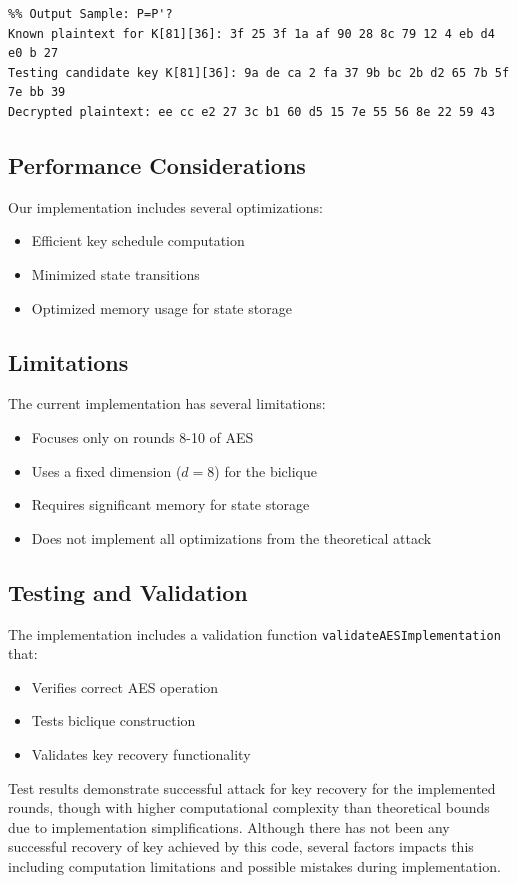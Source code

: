 \documentclass{report}
\begin{document}
\begin{verbatim}
%% Output Sample: P=P'?
Known plaintext for K[81][36]: 3f 25 3f 1a af 90 28 8c 79 12 4 eb d4 e0 b 27 
Testing candidate key K[81][36]: 9a de ca 2 fa 37 9b bc 2b d2 65 7b 5f 7e bb 39 
Decrypted plaintext: ee cc e2 27 3c b1 60 d5 15 7e 55 56 8e 22 59 43
\end{verbatim}

\subsection{Performance Considerations}
Our implementation includes several optimizations:
\begin{itemize}
    \item Efficient key schedule computation
    \item Minimized state transitions
    \item Optimized memory usage for state storage
\end{itemize}

\subsection{Limitations}
The current implementation has several limitations:
\begin{itemize}
    \item Focuses only on rounds 8-10 of AES
    \item Uses a fixed dimension ($d = 8$) for the biclique
    \item Requires significant memory for state storage
    \item Does not implement all optimizations from the theoretical attack
\end{itemize}

\subsection{Testing and Validation}
The implementation includes a validation function \texttt{validateAESImplementation} that:
\begin{itemize}
    \item Verifies correct AES operation
    \item Tests biclique construction
    \item Validates key recovery functionality
\end{itemize}

Test results demonstrate successful attack for key recovery for the implemented rounds, though with higher computational complexity than theoretical bounds due to implementation simplifications. Although there has not been any successful recovery of key achieved by this code, several factors impacts this including computation limitations and possible mistakes during implementation.



\end{document}

